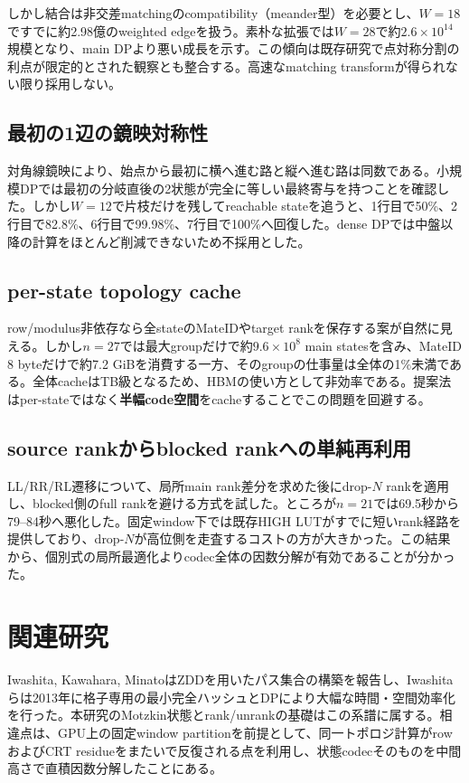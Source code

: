 \documentclass[a4paper,10pt,twocolumn]{ltjsarticle}
\begin{document}
しかし結合は非交差matchingのcompatibility（meander型）を必要とし、$W=18$ですでに約2.98億のweighted edgeを扱う。素朴な拡張では$W=28$で約$2.6\times10^{14}$規模となり、main DPより悪い成長を示す。この傾向は既存研究で点対称分割の利点が限定的とされた観察とも整合する\cite{iwashita2013}。高速なmatching transformが得られない限り採用しない。

\subsection{最初の1辺の鏡映対称性}
対角線鏡映により、始点から最初に横へ進む路と縦へ進む路は同数である。小規模DPでは最初の分岐直後の2状態が完全に等しい最終寄与を持つことを確認した。しかし$W=12$で片枝だけを残してreachable stateを追うと、1行目で50\%、2行目で82.8\%、6行目で99.98\%、7行目で100\%へ回復した。dense DPでは中盤以降の計算をほとんど削減できないため不採用とした。

\subsection{per-state topology cache}
row/modulus非依存なら全stateのMateIDやtarget rankを保存する案が自然に見える。しかし$n=27$では最大groupだけで約$9.6\times10^8$ main statesを含み、MateID 8 byteだけで約7.2 GiBを消費する一方、そのgroupの仕事量は全体の1\%未満である。全体cacheはTB級となるため、HBMの使い方として非効率である。提案法はper-stateではなく\textbf{半幅code空間}をcacheすることでこの問題を回避する。

\subsection{source rankからblocked rankへの単純再利用}
LL/RR/RL遷移について、局所main rank差分を求めた後にdrop-$N$ rankを適用し、blocked側のfull rankを避ける方式を試した。ところが$n=21$では69.5秒から79--84秒へ悪化した。固定window下では既存HIGH LUTがすでに短いrank経路を提供しており、drop-$N$が高位側を走査するコストの方が大きかった。この結果から、個別式の局所最適化よりcodec全体の因数分解が有効であることが分かった。

\section{関連研究}
Iwashita, Kawahara, MinatoはZDDを用いたパス集合の構築を報告し\cite{iwashita2012}、Iwashitaらは2013年に格子専用の最小完全ハッシュとDPにより大幅な時間・空間効率化を行った\cite{iwashita2013}。本研究のMotzkin状態とrank/unrankの基礎はこの系譜に属する。相違点は、GPU上の固定window partitionを前提として、同一トポロジ計算がrowおよびCRT residueをまたいで反復される点を利用し、状態codecそのものを中間高さで直積因数分解したことにある。
\end{document}
